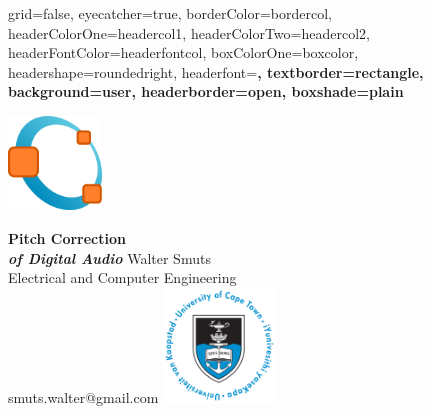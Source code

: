 \documentclass[a1paper,portrait,fontscale=0.4]{baposter}
\begin{document}
\begin{poster}{
	grid=false,
	eyecatcher=true,
	borderColor=bordercol,
	headerColorOne=headercol1,
	headerColorTwo=headercol2,
	headerFontColor=headerfontcol,
	boxColorOne=boxcolor,
	headershape=roundedright,
	headerfont=\Large\sf\bf,
	textborder=rectangle,
	background=user,
	headerborder=open,
  boxshade=plain
}
{
	\begin{minipage}[t][3cm][t]{3cm}\centering
	\vfill
	\includegraphics[width=2.5cm]{Octave}
	\vfill
	\vfill
	\end{minipage}
}
{\sf\bf
	Pitch Correction \\ \large\it of Digital Audio
}
{
	{\smaller\smaller 
	\vspace{1em} Walter Smuts\\
	Electrical and Computer Engineering\\
	smuts.walter@gmail.com}
}
{
	\includegraphics[width=3cm]{UCT-Transparent}
}


\end{poster}
\end{document}
